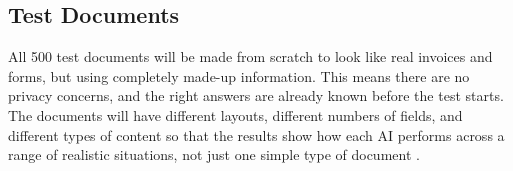 \subsection{Test Documents}

All 500 test documents will be made from scratch to look like real invoices and forms, but using completely made-up information. This means there are no privacy concerns, and the right answers are already known before the test starts. The documents will have different layouts, different numbers of fields, and different types of content so that the results show how each AI performs across a range of realistic situations, not just one simple type of document \cite{bujang_samplesize_2021}.
